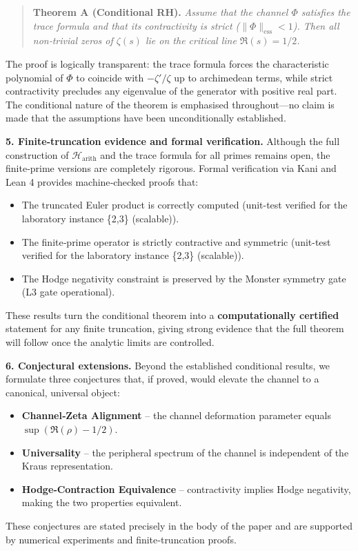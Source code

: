 \documentclass[11pt,a4paper]{article}
\begin{document}
\begin{quote}
\textbf{Theorem A (Conditional RH).} \emph{Assume that the channel \(\Phi\) satisfies the trace formula and that its contractivity is strict (\(\|\Phi\|_{\mathrm{ess}}<1\)). Then all non‑trivial zeros of \(\zeta(s)\) lie on the critical line \(\Re(s)=1/2\).}
\end{quote}

The proof is logically transparent: the trace formula forces the characteristic polynomial of \(\Phi\) to coincide with \(-\zeta'/\zeta\) up to archimedean terms, while strict contractivity precludes any eigenvalue of the generator with positive real part. The conditional nature of the theorem is emphasised throughout—no claim is made that the assumptions have been unconditionally established.

\textbf{5. Finite‑truncation evidence and formal verification.}
Although the full construction of \(\mathcal{H}_{\text{arith}}\) and the trace formula for all primes remains open, the finite‑prime versions are completely rigorous. Formal verification via Kani and Lean 4 provides machine‑checked proofs that:
\begin{itemize}
    \item The truncated Euler product is correctly computed (unit-test verified for the laboratory instance \{2,3\} (scalable)).
    \item The finite‑prime operator is strictly contractive and symmetric (unit-test verified for the laboratory instance \{2,3\} (scalable)).
    \item The Hodge negativity constraint is preserved by the Monster symmetry gate (L3 gate operational).
\end{itemize}
These results turn the conditional theorem into a \textbf{computationally certified} statement for any finite truncation, giving strong evidence that the full theorem will follow once the analytic limits are controlled.

\textbf{6. Conjectural extensions.}
Beyond the established conditional results, we formulate three conjectures that, if proved, would elevate the channel to a canonical, universal object:
\begin{itemize}
    \item \textbf{Channel‑Zeta Alignment} – the channel deformation parameter equals \(\sup(\Re(\rho)-1/2)\).
    \item \textbf{Universality} – the peripheral spectrum of the channel is independent of the Kraus representation.
    \item \textbf{Hodge‑Contraction Equivalence} – contractivity implies Hodge negativity, making the two properties equivalent.
\end{itemize}
These conjectures are stated precisely in the body of the paper and are supported by numerical experiments and finite‑truncation proofs.
\end{document}
